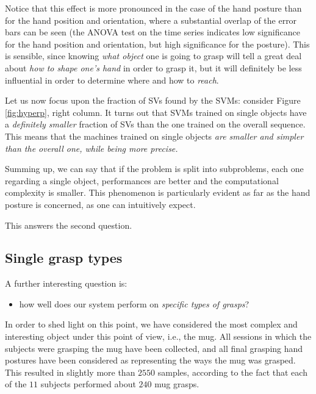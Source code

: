 Notice that this effect is more pronounced in the case of the hand
posture than for the hand position and orientation, where a
substantial overlap of the error bars can be seen (the ANOVA test on
the time series indicates low significance for the hand position and
orientation, but high significance for the posture). This is sensible,
since knowing \emph{what object} one is going to grasp will tell a
great deal about \emph{how to shape one's hand} in order to grasp it,
but it will definitely be less influential in order to determine where
and how to \emph{reach}.

Let us now focus upon the fraction of SVs found by the SVMs: consider
Figure \ref{fig:hyperp}, right column. It turns out that SVMs trained
on single objects have a \emph{definitely smaller} fraction of SVs
than the one trained on the overall sequence. This means that the
machines trained on single objects \emph{are smaller and simpler than
the overall one, while being more precise.}

Summing up, we can say that if the problem is split into subproblems,
each one regarding a single object, performances are better and the
computational complexity is smaller. This phenomenon is particularly
evident as far as the hand posture is concerned, as one can
intuitively expect.

This answers the second question.

\subsection{Single grasp types}

A further interesting question is:

\begin{itemize}

  \item how well does our system perform on \emph{specific types of
    grasps}?

\end{itemize}

In order to shed light on this point, we have considered the most
complex and interesting object under this point of view, i.e., the
mug. All sessions in which the subjects were grasping the mug have
been collected, and all final grasping hand postures have been
considered as representing the ways the mug was grasped. This resulted
in slightly more than $2550$ samples, according to the fact that each
of the $11$ subjects performed about $240$ mug grasps.

